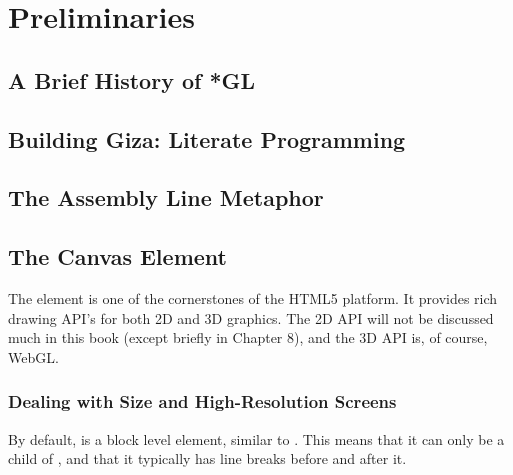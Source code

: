 \chapter{Preliminaries}

\section{A Brief History of *GL}

\section{Building Giza: Literate Programming}

\section{The Assembly Line Metaphor}

\section{The Canvas Element}


The  element is one of the cornerstones of the HTML5 platform.  It provides rich drawing API's for both 2D and 3D graphics.  The 2D API will not be discussed much in this book (except briefly in Chapter 8), and the 3D API is, of course, WebGL.

\subsection{Dealing with Size and High-Resolution Screens}

By default,  is a block level element, similar to .  This means that it can only be a child of , and that it typically has line breaks before and after it.

